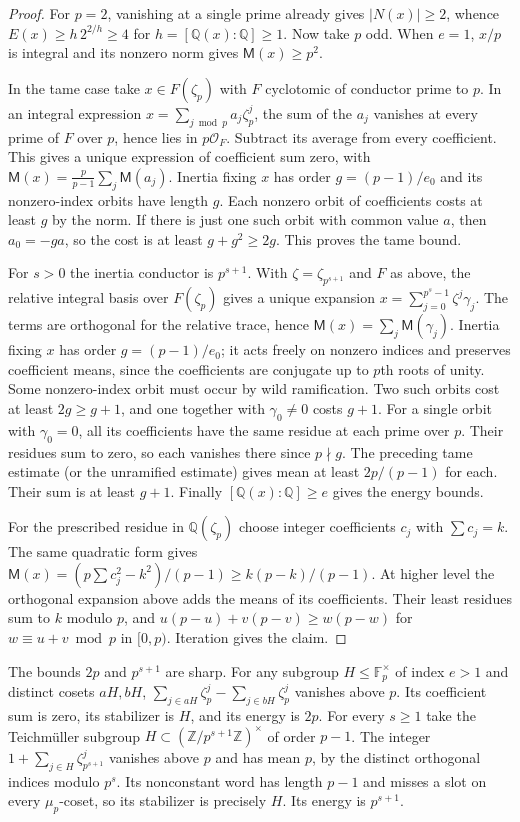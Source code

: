 \documentclass[11pt,a4paper]{article}
\numberwithin{equation}{section}
\theoremstyle{remark}
\newcommand{\ZZ}{\mathbb Z}
\newcommand{\QQ}{\mathbb Q}
\begin{document}
\begin{proof}
For $p=2$, vanishing at a single prime already gives $|N(x)|\ge2$, whence
$E(x)\ge h\,2^{2/h}\ge4$ for $h=[\QQ(x):\QQ]\ge1$. Now take $p$ odd.
When $e=1$, $x/p$ is integral and its nonzero norm gives
$\mathsf M(x)\ge p^2$.

In the tame case take $x\in F(\zeta_p)$ with $F$ cyclotomic of
conductor prime to $p$. In an integral expression
$x=\sum_{j\bmod p}a_j\zeta_p^j$, the sum of the $a_j$ vanishes at
every prime of $F$ over $p$, hence lies in $p\mathcal O_F$.
Subtract its average from every coefficient. This gives a unique
expression of coefficient sum zero, with
$\mathsf M(x)=\frac p{p-1}\sum_j\mathsf M(a_j)$.
Inertia fixing $x$ has order $g=(p-1)/e_0$ and its nonzero-index
orbits have length $g$. Each nonzero orbit of coefficients costs at
least $g$ by the norm. If there is just one such orbit with common
value $a$, then $a_0=-ga$, so the cost is at least $g+g^2\ge2g$.
This proves the tame bound.

For $s>0$ the inertia conductor is $p^{s+1}$. With
$\zeta=\zeta_{p^{s+1}}$ and $F$ as above, the relative integral
basis over $F(\zeta_p)$ gives a unique expansion
$x=\sum_{j=0}^{p^s-1}\zeta^j\gamma_j$. The terms are orthogonal
for the relative trace, hence $\mathsf M(x)=\sum_j\mathsf M(\gamma_j)$.
Inertia fixing $x$ has order $g=(p-1)/e_0$; it acts freely on
nonzero indices and preserves coefficient means, since the coefficients
are conjugate up to $p$th roots of unity. Some nonzero-index orbit
must occur by wild ramification. Two such orbits cost at least
$2g\ge g+1$, and one together with $\gamma_0\ne0$ costs $g+1$.
For a single orbit with $\gamma_0=0$, all its coefficients have the
same residue at each prime over $p$. Their residues sum to zero,
so each vanishes there since $p\nmid g$. The preceding tame
estimate (or the unramified estimate) gives mean at least
$2p/(p-1)$ for each. Their sum is at least $g+1$.
Finally $[\QQ(x):\QQ]\ge e$ gives the energy bounds.

For the prescribed residue in $\QQ(\zeta_p)$ choose integer
coefficients $c_j$ with $\sum c_j=k$. The same quadratic form gives
$\mathsf M(x)=(p\sum c_j^2-k^2)/(p-1)\ge k(p-k)/(p-1)$.
At higher level the orthogonal expansion above adds the means of its
coefficients. Their least residues sum to $k$ modulo $p$, and
$u(p-u)+v(p-v)\ge w(p-w)$ for $w\equiv u+v\bmod p$ in $[0,p)$.
Iteration gives the claim.
\end{proof}

The bounds $2p$ and $p^{s+1}$ are sharp. For any subgroup
$H\le\mathbb F_p^\times$ of index $e>1$ and distinct cosets $aH,bH$,
$\sum_{j\in aH}\zeta_p^j-\sum_{j\in bH}\zeta_p^j$ vanishes above $p$.
Its coefficient sum is zero, its stabilizer is $H$, and its energy is
$2p$. For every $s\ge1$ take the Teichm\"uller subgroup
$H\subset(\ZZ/p^{s+1}\ZZ)^\times$ of order $p-1$. The integer
$1+\sum_{j\in H}\zeta_{p^{s+1}}^j$ vanishes above $p$ and has mean
$p$, by the distinct orthogonal indices modulo $p^s$. Its nonconstant
word has length $p-1$ and misses a slot on every $\mu_p$-coset,
so its stabilizer is precisely $H$. Its energy is $p^{s+1}$.
\end{document}
